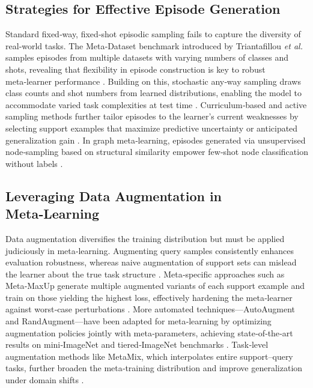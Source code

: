 \subsection{Strategies for Effective Episode Generation}

Standard fixed‑way, fixed‑shot episodic sampling fails to capture the diversity of real‑world tasks. The Meta‑Dataset benchmark introduced by Triantafillou \emph{et al.} samples episodes from multiple datasets with varying numbers of classes and shots, revealing that flexibility in episode construction is key to robust meta‑learner performance \cite{triantafillou2019meta}. Building on this, stochastic any‑way sampling draws class counts and shot numbers from learned distributions, enabling the model to accommodate varied task complexities at test time \cite{lee2024any}. Curriculum‑based and active sampling methods further tailor episodes to the learner’s current weaknesses by selecting support examples that maximize predictive uncertainty or anticipated generalization gain \cite{settles2011theories}. In graph meta‑learning, episodes generated via unsupervised node‑sampling based on structural similarity empower few‑shot node classification without labels \cite{jung2023unsupervised}.

\subsection{Leveraging Data Augmentation in Meta‑Learning}

Data augmentation diversifies the training distribution but must be applied judiciously in 
meta‑learning. Augmenting query samples consistently enhances evaluation robustness, 
whereas naive augmentation of support sets can mislead the learner about the true task 
structure \cite{hendrycks2020augmix}. Meta‑specific approaches such as Meta‑MaxUp generate 
multiple augmented variants of each support example and train on those yielding the highest 
loss, effectively hardening the meta‑learner against worst‑case perturbations \cite{ni2021data}. 
More automated techniques—AutoAugment and RandAugment—have been adapted for meta‑learning 
by optimizing augmentation policies jointly with meta‑parameters, achieving state‑of‑the‑art 
results on mini‑ImageNet and tiered‑ImageNet benchmarks \cite{cubuk2018autoaugment, hendrycks2020augmix}. 
Task‑level augmentation methods like MetaMix, which interpolates entire support–query tasks, 
further broaden the meta‑training distribution and improve generalization under domain 
shifts \cite{yao2021improving}.

